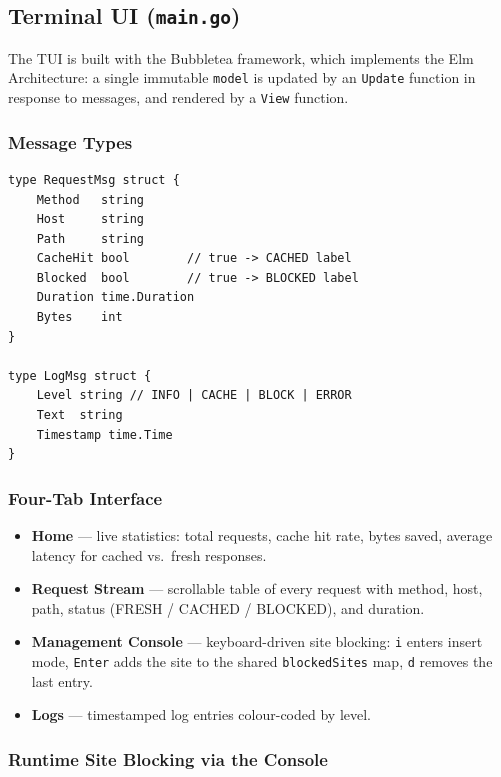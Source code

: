 \documentclass[11pt,a4paper]{article}
\begin{document}
\subsection{Terminal UI (\texttt{main.go})}

The TUI is built with the Bubbletea framework, which implements the Elm
Architecture: a single immutable \texttt{model} is updated by an \texttt{Update}
function in response to messages, and rendered by a \texttt{View} function.

\subsubsection{Message Types}

\begin{lstlisting}[caption={Typed messages sent from proxy goroutines to the TUI.}]
type RequestMsg struct {
    Method   string
    Host     string
    Path     string
    CacheHit bool        // true -> CACHED label
    Blocked  bool        // true -> BLOCKED label
    Duration time.Duration
    Bytes    int
}

type LogMsg struct {
    Level string // INFO | CACHE | BLOCK | ERROR
    Text  string
    Timestamp time.Time
}
\end{lstlisting}

\subsubsection{Four-Tab Interface}

\begin{itemize}
  \item \textbf{Home} --- live statistics: total requests, cache hit rate,
    bytes saved, average latency for cached vs.\ fresh responses.
  \item \textbf{Request Stream} --- scrollable table of every request with
    method, host, path, status (FRESH / CACHED / BLOCKED), and duration.
  \item \textbf{Management Console} --- keyboard-driven site blocking:
    \texttt{i} enters insert mode, \texttt{Enter} adds the site to the shared
    \texttt{blockedSites} map, \texttt{d} removes the last entry.
  \item \textbf{Logs} --- timestamped log entries colour-coded by level.
\end{itemize}

\subsubsection{Runtime Site Blocking via the Console}
\end{document}
